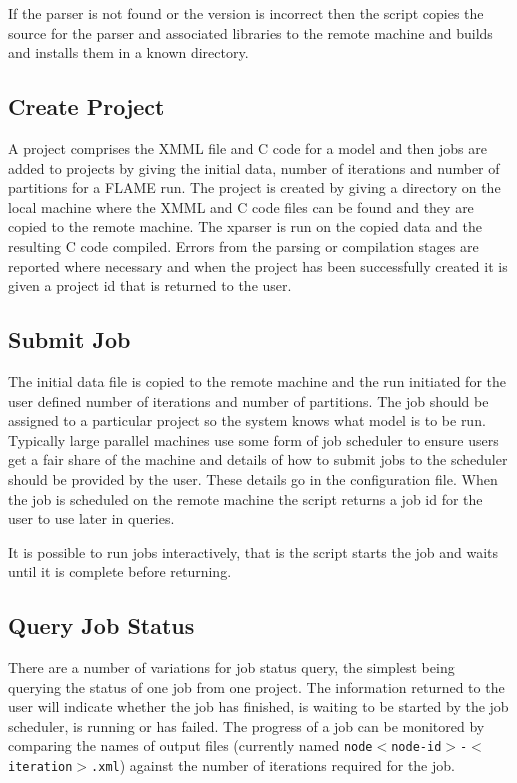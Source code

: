 If the parser is not found or the version is incorrect then the script copies the source for the parser and associated libraries to the remote machine and builds and installs them in a known directory.

\subsection{Create Project}

A project comprises the XMML file and C code for a model and then jobs are added to projects by giving the initial data, number of iterations and number of partitions for a FLAME run. The project is created by giving a directory on the local machine where the XMML and C code files can be found and they are copied to the remote machine. The xparser is run on the copied data and the resulting C code compiled. Errors from the parsing or compilation stages are reported where necessary and when the project has been successfully created it is given a project id that is returned to the user. 

\subsection{Submit Job}

The initial data file is copied to the remote machine and the run initiated for the user defined number of iterations and number of partitions. The job should be assigned to a particular project so the system knows what model is to be run.  Typically large parallel machines use some form of job scheduler to ensure users get a fair share of the machine and details of how to submit jobs to the scheduler should be provided by the user. These details go in the configuration file. When the job is scheduled on the remote machine the script returns a job id for the user to use later in queries.

It is possible to run jobs interactively, that is the script starts the job and waits until it is complete before returning.

\subsection{Query Job Status}

There are a number of variations for job status query, the simplest being querying the status of one job from one project. The information returned to the user will indicate whether the job has finished, is waiting to be started by the job scheduler, is running or has failed. The progress of a job can be monitored by comparing the names of output files (currently named \texttt{node$<$node-id$>$-$<$iteration$>$.xml}) against the number of iterations required for the job.

